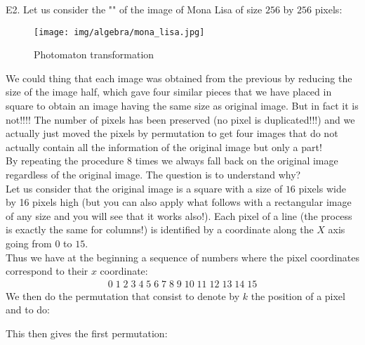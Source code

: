	\pagebreak
	\begin{tcolorbox}[colframe=black,colback=white,sharp corners]
	E2. Let us consider the "" of the image of Mona Lisa of size $256$ by $256$ pixels:
	\begin{figure}[H]
		\centering
		\texttt{[image: img/algebra/mona\_lisa.jpg]}
		\caption{Photomaton transformation}
	\end{figure}
	We could thing that each image was obtained from the previous by reducing the size of the image half, which gave four similar pieces that we have placed in square to obtain an image having the same size as original image. But in fact it is not!!!! The number of pixels has been preserved (no pixel is duplicated!!!) and we actually just moved the pixels by permutation to get four images that do not actually contain all the information of the original image but only a part!\\
	
	By repeating the procedure $8$ times we always fall back on the original image regardless of the original image. The question is to understand why?\\
	
	Let us consider that the original image is a square with a size of $16$ pixels wide by 16 pixels high (but you can also apply what follows with a rectangular image of any size and you will see that it works also!). Each pixel of a line (the process is exactly the same for columns!) is identified by a coordinate along the $X$ axis going from $0$ to $15$.\\
	
	Thus we have at the beginning a sequence of numbers where the pixel coordinates correspond to their $x$ coordinate:
	\begin{gather*}
		0\; 1\; 2\; 3\; 4\; 5\; 6\; 7\; 8\; 9\; 10\; 11\; 12\; 13\; 14\; 15
	\end{gather*}
	We then do the permutation that consist to denote by $k$ the position of a pixel and to do:
	
	This then gives the first permutation:
	\end{tcolorbox}

